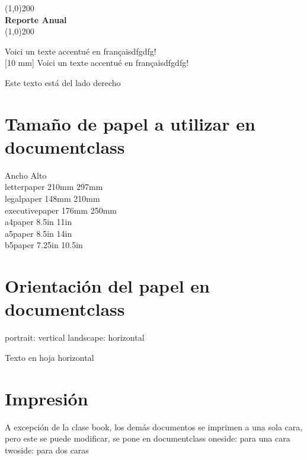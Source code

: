 \documentclass{article}
\begin{document}
\begin{titlepage}
	\begin{center}
		
		\line(1,0){200}\\
		\huge{\bfseries Reporte Anual}\\
		\line(1,0){200}\\


	\end{center}
\end{titlepage}

Voici un texte accentué en françaisdfgdfg!\\
[10 mm] %
Voici un texte accentué en françaisdfgdfg!\\

\begin{flushright} %

	Este texto está del lado derecho

\end{flushright}

\section{Tamaño de papel a utilizar en documentclass}
 Ancho 	Alto \\
 letterpaper 210mm 297mm\\
legalpaper 148mm 210mm\\
executivepaper 176mm 250mm\\
a4paper 8.5in 11in\\
a5paper 8.5in 14in\\
b5paper 7.25in 10.5in\\

\section{Orientación del papel en documentclass}
portrait: vertical
landscape: horizontal

\begin{landscape}
	Texto en hoja horizontal
\end{landscape}

\section{Impresión}
A excepción de la clase book, los demás documentos se imprimen a una sola cara, pero este se puede modificar, se pone en documentclass
oneside: para una cara
twoside: para dos caras
\end{document}
